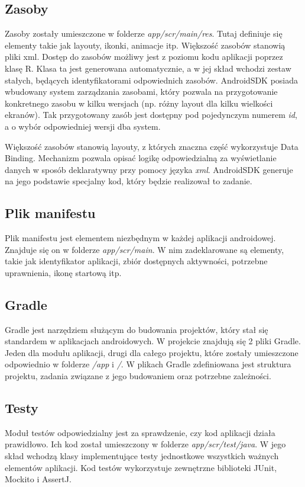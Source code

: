 \documentclass[openright]{xmgr}
\begin{document}
\subsection*{Zasoby}
Zasoby zostały umieszczone w folderze \textit{app/scr/main/res}. Tutaj definiuje się elementy takie jak layouty, ikonki, animacje itp. Większość zasobów stanowią pliki xml. Dostęp do zasobów możliwy jest z poziomu kodu aplikacji poprzez klasę R. Klasa ta jest generowana automatycznie, a w jej skład wchodzi zestaw stałych, będących identyfikatorami odpowiednich zasobów. AndroidSDK posiada wbudowany system zarządzania zasobami, który pozwala na przygotowanie konkretnego zasobu w kilku wersjach (np. różny layout dla kilku wielkości ekranów). Tak przygotowany zasób jest dostępny pod pojedynczym numerem \textit{id}, a o wybór odpowiedniej wersji dba system.

Większość zasobów stanowią layouty, z których znaczna część wykorzystuje Data Binding. Mechanizm pozwala opisać logikę odpowiedzialną za wyświetlanie danych w sposób deklaratywny przy pomocy języka \textit{xml}. AndroidSDK generuje na jego podstawie specjalny kod, który będzie realizował to zadanie. 

\subsection*{Plik manifestu}
Plik manifestu jest elementem niezbędnym w każdej aplikacji androidowej. Znajduje się on w folderze \textit{app/scr/main}. W nim zadeklarowane są elementy, takie jak identyfikator aplikacji, zbiór dostępnych aktywności, potrzebne uprawnienia, ikonę startową itp.

\subsection*{Gradle}
Gradle jest narzędziem służącym do budowania projektów, który stał się standardem w aplikacjach androidowych. W projekcie znajdują się 2 pliki Gradle. Jeden dla modułu aplikacji, drugi dla całego projektu, które zostały umieszczone odpowiednio w folderze \textit{/app} i \textit{/}. W plikach Gradle zdefiniowana jest struktura projektu, zadania związane z jego budowaniem oraz potrzebne zależności.

\subsection*{Testy}
Moduł testów odpowiedzialny jest za sprawdzenie, czy kod aplikacji działa prawidłowo. Ich  kod został umieszczony w folderze \textit{app/scr/test/java}. W jego skład wchodzą klasy implementujące testy jednostkowe wszystkich ważnych elementów aplikacji. Kod testów wykorzystuje zewnętrzne biblioteki JUnit, Mockito i AssertJ.
\end{document}
